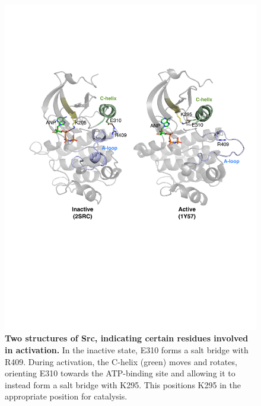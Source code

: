 \documentclass[aps,pre,twocolumn,nofootinbib,superscriptaddress,linenumbers]{revtex4-1}
\begin{document}
\begin{figure}[tb]
  \centering
    \includegraphics[width=1.0\textwidth]{residue_pair_distances/src/src_ref_structures}
    \caption{{\bf Two structures of Src, indicating certain residues involved in activation.}
    In the inactive state, E310 forms a salt bridge with R409.
    During activation, the C-helix (green) moves and rotates, orienting E310 towards the ATP-binding site and allowing it to instead form a salt bridge with K295.
    This positions K295 in the appropriate position for catalysis.
  }
  \label{figsrc_ref_structures}
\end{figure}
\end{document}
